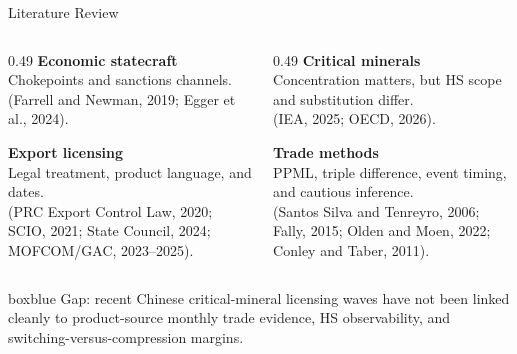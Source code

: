 \documentclass[aspectratio=169,11pt]{beamer}
\newcommand{\plainbox}[2]{%
  \begin{beamercolorbox}[rounded=true,sep=0.48em,wd=\textwidth]{#1}
    #2
  \end{beamercolorbox}
}
\begin{document}
\begin{frame}{Literature Review}
  \footnotesize
  \begin{columns}[T,totalwidth=\textwidth]
    \begin{column}{0.49\textwidth}
      \textbf{Economic statecraft}\\
      Chokepoints and sanctions channels.\\
      {\scriptsize (Farrell and Newman, 2019; Egger et al., 2024).}

      \vspace{0.18cm}
      \textbf{Export licensing}\\
      Legal treatment, product language, and dates.\\
      {\scriptsize (PRC Export Control Law, 2020; SCIO, 2021; State Council, 2024; MOFCOM/GAC, 2023--2025).}
    \end{column}
    \begin{column}{0.49\textwidth}
      \textbf{Critical minerals}\\
      Concentration matters, but HS scope and substitution differ.\\
      {\scriptsize (IEA, 2025; OECD, 2026).}

      \vspace{0.18cm}
      \textbf{Trade methods}\\
      PPML, triple difference, event timing, and cautious inference.\\
      {\scriptsize (Santos Silva and Tenreyro, 2006; Fally, 2015; Olden and Moen, 2022; Conley and Taber, 2011).}
    \end{column}
  \end{columns}

  \vspace{0.08cm}
  \plainbox{boxblue}{%
    \small Gap: recent Chinese critical-mineral licensing waves have not been linked cleanly to product-source monthly trade evidence, HS observability, and switching-versus-compression margins.
  }
\end{frame}
\end{document}
